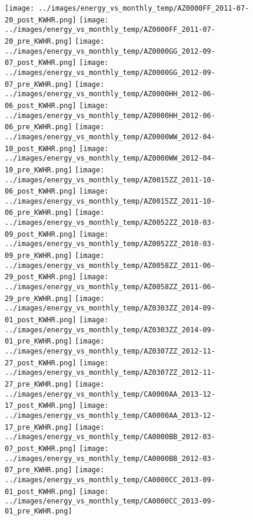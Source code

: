 \clearpage
\begin{figure}
\centering
\texttt{[image: ../images/energy\_vs\_monthly\_temp/AZ0000FF\_2011-07-20\_post\_KWHR.png]}
\texttt{[image: ../images/energy\_vs\_monthly\_temp/AZ0000FF\_2011-07-20\_pre\_KWHR.png]}
\texttt{[image: ../images/energy\_vs\_monthly\_temp/AZ0000GG\_2012-09-07\_post\_KWHR.png]}
\texttt{[image: ../images/energy\_vs\_monthly\_temp/AZ0000GG\_2012-09-07\_pre\_KWHR.png]}
\texttt{[image: ../images/energy\_vs\_monthly\_temp/AZ0000HH\_2012-06-06\_post\_KWHR.png]}
\texttt{[image: ../images/energy\_vs\_monthly\_temp/AZ0000HH\_2012-06-06\_pre\_KWHR.png]}
\texttt{[image: ../images/energy\_vs\_monthly\_temp/AZ0000WW\_2012-04-10\_post\_KWHR.png]}
\texttt{[image: ../images/energy\_vs\_monthly\_temp/AZ0000WW\_2012-04-10\_pre\_KWHR.png]}
\texttt{[image: ../images/energy\_vs\_monthly\_temp/AZ0015ZZ\_2011-10-06\_post\_KWHR.png]}
\texttt{[image: ../images/energy\_vs\_monthly\_temp/AZ0015ZZ\_2011-10-06\_pre\_KWHR.png]}
\texttt{[image: ../images/energy\_vs\_monthly\_temp/AZ0052ZZ\_2010-03-09\_post\_KWHR.png]}
\texttt{[image: ../images/energy\_vs\_monthly\_temp/AZ0052ZZ\_2010-03-09\_pre\_KWHR.png]}
\texttt{[image: ../images/energy\_vs\_monthly\_temp/AZ0058ZZ\_2011-06-29\_post\_KWHR.png]}
\texttt{[image: ../images/energy\_vs\_monthly\_temp/AZ0058ZZ\_2011-06-29\_pre\_KWHR.png]}
\texttt{[image: ../images/energy\_vs\_monthly\_temp/AZ0303ZZ\_2014-09-01\_post\_KWHR.png]}
\texttt{[image: ../images/energy\_vs\_monthly\_temp/AZ0303ZZ\_2014-09-01\_pre\_KWHR.png]}
\texttt{[image: ../images/energy\_vs\_monthly\_temp/AZ0307ZZ\_2012-11-27\_post\_KWHR.png]}
\texttt{[image: ../images/energy\_vs\_monthly\_temp/AZ0307ZZ\_2012-11-27\_pre\_KWHR.png]}
\texttt{[image: ../images/energy\_vs\_monthly\_temp/CA0000AA\_2013-12-17\_post\_KWHR.png]}
\texttt{[image: ../images/energy\_vs\_monthly\_temp/CA0000AA\_2013-12-17\_pre\_KWHR.png]}
\texttt{[image: ../images/energy\_vs\_monthly\_temp/CA0000BB\_2012-03-07\_post\_KWHR.png]}
\texttt{[image: ../images/energy\_vs\_monthly\_temp/CA0000BB\_2012-03-07\_pre\_KWHR.png]}
\texttt{[image: ../images/energy\_vs\_monthly\_temp/CA0000CC\_2013-09-01\_post\_KWHR.png]}
\texttt{[image: ../images/energy\_vs\_monthly\_temp/CA0000CC\_2013-09-01\_pre\_KWHR.png]}
\end{figure}
